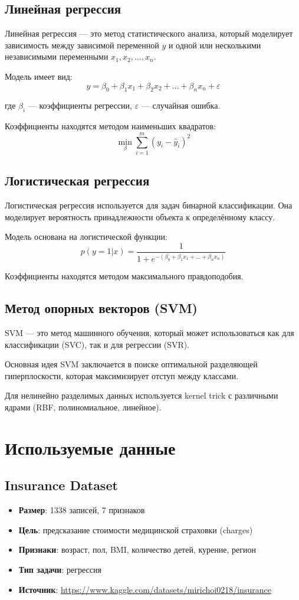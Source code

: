 \documentclass[a4paper]{article}
\begin{document}
\subsection{Линейная регрессия}

Линейная регрессия — это метод статистического анализа, который моделирует зависимость между зависимой переменной $y$ и одной или несколькими независимыми переменными $x_1, x_2, \ldots, x_n$.

Модель имеет вид:
$$y = \beta_0 + \beta_1 x_1 + \beta_2 x_2 + \ldots + \beta_n x_n + \varepsilon$$

где $\beta_i$ — коэффициенты регрессии, $\varepsilon$ — случайная ошибка.

Коэффициенты находятся методом наименьших квадратов:
$$\min_{\beta} \sum_{i=1}^{m} (y_i - \hat{y}_i)^2$$

\subsection{Логистическая регрессия}

Логистическая регрессия используется для задач бинарной классификации. Она моделирует вероятность принадлежности объекта к определённому классу.

Модель основана на логистической функции:
$$p(y=1|x) = \frac{1}{1 + e^{-(\beta_0 + \beta_1 x_1 + \ldots + \beta_n x_n)}}$$

Коэффициенты находятся методом максимального правдоподобия.

\subsection{Метод опорных векторов (SVM)}

SVM — это метод машинного обучения, который может использоваться как для классификации (SVC), так и для регрессии (SVR).

Основная идея SVM заключается в поиске оптимальной разделяющей гиперплоскости, которая максимизирует отступ между классами.

Для нелинейно разделимых данных используется kernel trick с различными ядрами (RBF, полиномиальное, линейное).

\section{Используемые данные}

\subsection{Insurance Dataset}
\begin{itemize}
    \item \textbf{Размер}: 1338 записей, 7 признаков
    \item \textbf{Цель}: предсказание стоимости медицинской страховки (charges)
    \item \textbf{Признаки}: возраст, пол, BMI, количество детей, курение, регион
    \item \textbf{Тип задачи}: регрессия
    \item \textbf{Источник}: \url{https://www.kaggle.com/datasets/mirichoi0218/insurance}
\end{itemize}
\end{document}

